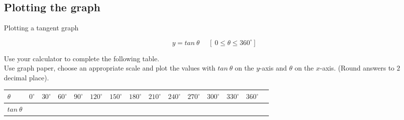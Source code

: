 \subsection*{Plotting the graph}
\pagebreak %
\begin{wex}
{Plotting a tangent graph}
{
\begin{equation*}
 y=tan~ \theta~~~~~~[~0 \leq \theta \leq 360^{\circ}]
\end{equation*}

Use your calculator to complete the following table. \\
Use graph paper, choose an appropriate scale and plot the values with $tan~\theta $ on the $y$-axis and $\theta $ on the $x$-axis. (Round answers to $2$ decimal place). 

\begin{table}[H]


\begin{tabular}{|m{0.6cm}|m{0.5cm}|m{0.5cm}|m{0.5cm}|m{0.5cm}|m{0.5cm}|m{0.5cm}|m{0.5cm}|m{0.5cm}|m{0.5cm}|m{0.5cm}|m{0.5cm}|m{0.5cm}|m{0.5cm}|} \hline

\footnotesize$\theta $&
\footnotesize$0^{\circ }$&
\footnotesize$30^{\circ }$&
\footnotesize$60^{\circ }$&
\footnotesize$90^{\circ }$&
\footnotesize$120^{\circ }$&
\footnotesize$150^{\circ }$&
\footnotesize$180^{\circ }$&
\footnotesize$210^{\circ }$&
\footnotesize$240^{\circ }$&
\footnotesize$270^{\circ }$&
\footnotesize$300^{\circ }$&
\footnotesize$330^{\circ }$&
\footnotesize$360^{\circ }$
\\ \hline

\footnotesize$tan~\theta $&
&
&
&
&
&
&
&
&
&
&
&
&
&

 \hline
\end{tabular}

\end{table}
}
{
\begin{table}[H]


\begin{tabular}{|m{0.6cm}|m{0.3cm}|m{0.5cm}|m{0.5cm}|m{0.3cm}|m{0.6cm}|m{0.6cm}|m{0.4cm}|m{0.5cm}|m{0.5cm}|m{0.4cm}|m{0.6cm}|m{0.7cm}|m{0.5cm}|} \hline


\end{tabular}
\end{table}}
\end{wex}

